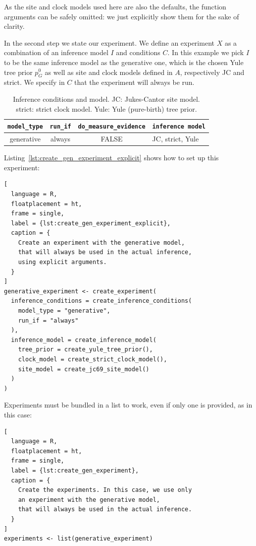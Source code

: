 As the site and clock models used here are also the defaults, 
the function arguments can be safely omitted: we just explicitly show them for the sake of clarity.

In the second step we state our experiment.
We define an experiment $\mathit{X}$ as a combination of an inference model 
$\mathit{I}$
and conditions $\mathit{C}$.
In this example we pick $\mathit{I}$ to be the same inference model as the generative one,
which is the chosen Yule tree prior $\mathit{p_{G}^0}$ as well as site and clock models defined in $\mathit{A}$, respectively JC and strict.
We specify in $\mathit{C}$ that the experiment will always be run.

\begin{table}
  \begin{tabular}{ | c | c | c | l | }
    \hline
    \texttt{model\_type} &
    \texttt{run\_if} &
    \texttt{do\_measure\_evidence} & 
    \texttt{inference model} \\ 
    \hline
    generative &
    always &
    FALSE &
    JC, strict, Yule \\
    \hline
  \end{tabular}
  \caption{
    Inference conditions and model.
    JC: Jukes-Cantor site model.
    strict: strict clock model.
    Yule: Yule (pure-birth) tree prior.
  }
  \label{tab:RQ1}
\end{table}

Listing~\ref{lst:create_gen_experiment_explicit} shows how to
set up this experiment:

\begin{lstlisting}[
  language = R,
  floatplacement = ht,
  frame = single,
  label = {lst:create_gen_experiment_explicit},
  caption = {
    Create an experiment with the generative model,
    that will always be used in the actual inference, 
    using explicit arguments.
  }
]
generative_experiment <- create_experiment(
  inference_conditions = create_inference_conditions(
    model_type = "generative", 
    run_if = "always"
  ), 
  inference_model = create_inference_model(
    tree_prior = create_yule_tree_prior(),
    clock_model = create_strict_clock_model(), 
    site_model = create_jc69_site_model()
  )
)
\end{lstlisting}

Experiments must be bundled in a list to work, even if only one is provided, as 
in this case:

\begin{lstlisting}[
  language = R, 
  floatplacement = ht,
  frame = single,
  label = {lst:create_gen_experiment},
  caption = {
    Create the experiments. In this case, we use only
    an experiment with the generative model,
    that will always be used in the actual inference.
  }
]
experiments <- list(generative_experiment)
\end{lstlisting}

